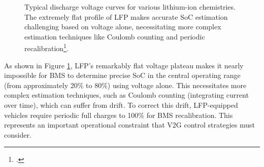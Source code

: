 \begin{figure}[H]
    \centering
    \caption{Typical discharge voltage curves for various lithium-ion chemistries. The extremely flat profile of LFP makes accurate SoC estimation challenging based on voltage alone, necessitating more complex estimation techniques like Coulomb counting and periodic recalibration\footcite{plett2015battery}.}
    \label{fig:voltage_curves_detailed}
\end{figure}
\noindent
As shown in Figure \ref{fig:voltage_curves_detailed}, LFP's remarkably flat voltage plateau makes it nearly impossible for BMS to determine precise SoC in the central operating range (from approximately 20\% to 80\%) using voltage alone. This necessitates more complex estimation techniques, such as Coulomb counting (integrating current over time), which can suffer from drift. To correct this drift, LFP-equipped vehicles require periodic full charges to 100\% for BMS recalibration. This represents an important operational constraint that V2G control strategies must consider.

